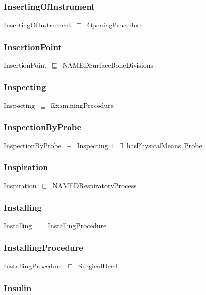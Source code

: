 \documentclass{article}
\begin{document}
\subsubsection*{InsertingOfInstrument}

InsertingOfInstrument~\ensuremath{\sqsubseteq}~OpeningProcedure~

\subsubsection*{InsertionPoint}

InsertionPoint~\ensuremath{\sqsubseteq}~NAMEDSurfaceBoneDivisions~

\subsubsection*{Inspecting}

Inspecting~\ensuremath{\sqsubseteq}~ExaminingProcedure~

\subsubsection*{InspectionByProbe}

InspectionByProbe~\ensuremath{\equiv}~Inspecting~\ensuremath{\sqcap}~\ensuremath{\exists}~hasPhysicalMeans~Probe

\subsubsection*{Inspiration}

Inspiration~\ensuremath{\sqsubseteq}~NAMEDRespiratoryProcess~

\subsubsection*{Installing}

Installing~\ensuremath{\sqsubseteq}~InstallingProcedure~

\subsubsection*{InstallingProcedure}

InstallingProcedure~\ensuremath{\sqsubseteq}~SurgicalDeed~

\subsubsection*{Insulin}
\end{document}
